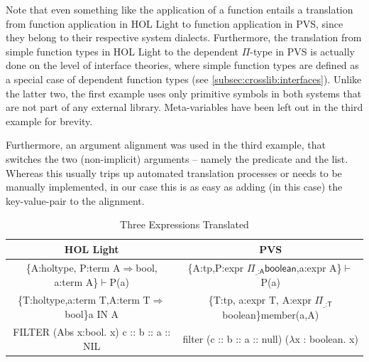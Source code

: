 Note that even something like the application of a function entails a translation from function application in HOL Light to function application in PVS, since they belong to their respective system dialects. Furthermore, the translation from simple function types in HOL Light to the dependent $\Pi$-type in PVS is actually done on the level of interface theories, where simple function types are defined as a special case of dependent function types (see \autoref{subsec:crosslib:interfaces}). Unlike the latter two, the first example uses only primitive symbols in both systems that are not part of any external library. Meta-variables have been left out in the third example for brevity. 

Furthermore, an argument alignment was used in the third example, that switches the two (non-implicit) arguments -- namely the predicate and the list. Whereas this usually trips up automated translation processes or needs to be manually implemented, in our case this is as easy as adding (in this case) the key-value-pair  to the alignment.
\begin{table}[ht]\centering	\footnotesize
  \begin{tabular}{|c|c|}
 	\hline HOL Light & PVS \\ 
  	\hline \textsf{\{A:holtype, P:term A$\Longrightarrow$bool, a:term A\}$\vdash$P(a)} & \textsf{\{A:tp,P:expr $\Pi_{\textsf{\_:A}}\textsf{boolean}$,a:expr A\}$\vdash$P(a)} \\ 
  	\hline \textsf{\{T:holtype,a:term T,A:term T$\Longrightarrow$bool\}a IN A} & \textsf{\{T:tp, a:expr T, A:expr $\Pi_{\textsf{\_:T}}$boolean\}member(a,A)} \\ 
  	\hline \textsf{FILTER (Abs x:bool. x) c :: b :: a :: NIL} & \textsf{filter (c :: b :: a :: null) ($\lambda$x : boolean. x)} \\ 
  	\hline 
  \end{tabular}
  \caption{Three Expressions Translated}\label{tbl:translate}
\end{table}